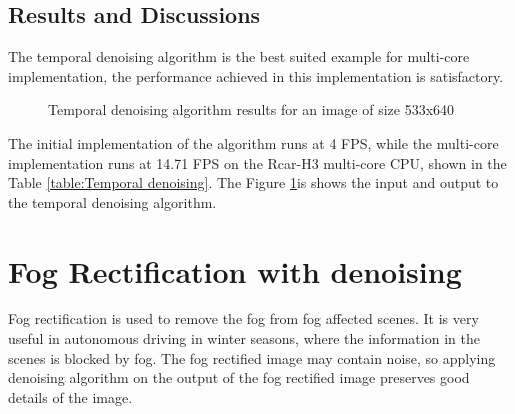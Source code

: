 \subsection{Results and Discussions}
The temporal denoising algorithm is the best suited example for multi-core implementation, the performance achieved in this implementation is satisfactory. 
\begin{figure}[h!]
	\centering
	\qquad
	\caption{Temporal denoising algorithm results for an image of size 533x640  }%
	\label{fig:fog rectification results}%
\end{figure}
The initial implementation of the algorithm runs at 4 FPS, while the multi-core implementation runs at 14.71 FPS on the Rcar-H3 multi-core CPU, shown in the Table \ref{table:Temporal denoising}. The Figure \ref{fig:fog rectification results}is shows the input and output to the temporal denoising algorithm.
\begin{table}[h!]
	\centering
	\caption{Temporal denoising performance statistics}
	\label{table:Temporal denoising}
\end{table}
\section{Fog Rectification with denoising}
Fog rectification is used to remove the fog from fog affected scenes. It is very useful in autonomous driving in winter seasons, where the information in the scenes is blocked by fog. The fog rectified image may contain noise, so applying denoising algorithm on the output of the fog rectified image preserves good details of the image.
